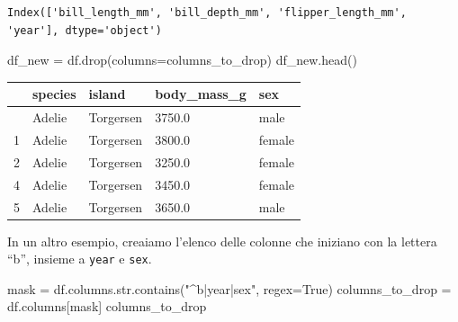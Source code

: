 \documentclass[
  letterpaper,
  krantz2]{{[}./krantz{]}}
\newenvironment{Shaded}{\begin{snugshade}}{\end{snugshade}}
\newcommand{\BuiltInTok}[1]{\textcolor[rgb]{0.00,0.23,0.31}{#1}}
\newcommand{\NormalTok}[1]{\textcolor[rgb]{0.00,0.23,0.31}{#1}}
\newcommand{\OperatorTok}[1]{\textcolor[rgb]{0.37,0.37,0.37}{#1}}
\newcommand{\StringTok}[1]{\textcolor[rgb]{0.13,0.47,0.30}{#1}}
\newcommand{\VariableTok}[1]{\textcolor[rgb]{0.07,0.07,0.07}{#1}}
\begin{document}
\begin{Shaded}
\end{Shaded}

\begin{verbatim}
Index(['bill_length_mm', 'bill_depth_mm', 'flipper_length_mm', 'year'], dtype='object')
\end{verbatim}

\begin{Shaded}
\begin{Highlighting}[]
\NormalTok{df\_new }\OperatorTok{=}\NormalTok{ df.drop(columns}\OperatorTok{=}\NormalTok{columns\_to\_drop)}
\NormalTok{df\_new.head()}
\end{Highlighting}
\end{Shaded}

\begin{longtable}[]{@{}lllll@{}}
\toprule\noalign{}
& species & island & body\_mass\_g & sex \\
\midrule\noalign{}
\endhead
\bottomrule\noalign{}
\endlastfoot
0 & Adelie & Torgersen & 3750.0 & male \\
1 & Adelie & Torgersen & 3800.0 & female \\
2 & Adelie & Torgersen & 3250.0 & female \\
4 & Adelie & Torgersen & 3450.0 & female \\
5 & Adelie & Torgersen & 3650.0 & male \\
\end{longtable}

In un altro esempio, creaiamo l'elenco delle colonne che iniziano con la
lettera ``b'', insieme a \texttt{year} e \texttt{sex}.

\begin{Shaded}
\begin{Highlighting}[]
\NormalTok{mask }\OperatorTok{=}\NormalTok{ df.columns.}\BuiltInTok{str}\NormalTok{.contains(}\StringTok{"\^{}b|year|sex"}\NormalTok{, regex}\OperatorTok{=}\VariableTok{True}\NormalTok{)}
\NormalTok{columns\_to\_drop }\OperatorTok{=}\NormalTok{ df.columns[mask]}
\NormalTok{columns\_to\_drop}
\end{Highlighting}
\end{Shaded}
\end{document}
